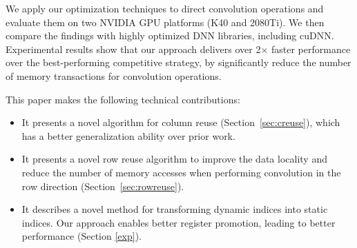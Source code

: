 
We apply our optimization techniques to direct convolution operations and evaluate them on two NVIDIA GPU platforms (K40 and 2080Ti). We
then compare the findings with highly optimized DNN libraries, including cuDNN. Experimental results show that our approach delivers over
2$\times$ faster performance over the best-performing competitive strategy, by significantly reduce the number of memory transactions for
convolution operations.

This paper makes the following technical contributions:
\begin{itemize}
  \item It presents a novel algorithm for column reuse (Section~\ref{sec:creuse}), which has a better generalization
      ability over prior work.
  \item It presents a novel row reuse algorithm to improve the data locality and reduce the number of memory accesses
      when performing convolution in the row direction (Section~\ref {sec:rowreuse}).
  \item It describes a novel method for transforming dynamic indices into static indices. Our approach enables better
      register promotion, leading to better performance (Section \ref{exp}).
\end{itemize}
